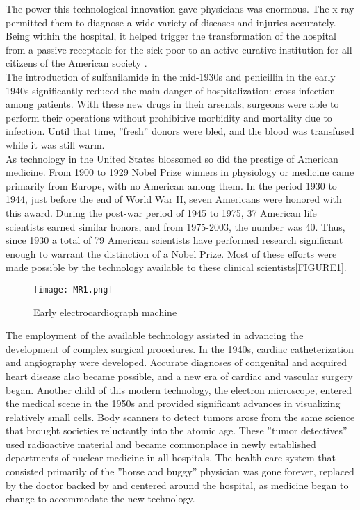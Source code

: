 \documentclass[12pt]{article}
\begin{document}
The power this technological innovation gave physicians was enormous.
The x\- ray permitted them to diagnose a wide variety of diseases and injuries accurately.
Being within the hospital, it helped trigger the transformation of the hospital from a passive receptacle for the sick poor to an active curative institution for all citizens of the American society .\\


The introduction of sulfanilamide in the mid-1930s and penicillin in the early 1940s significantly reduced the main danger of hospitalization: cross infection among patients.
With these new drugs in their arsenals, surgeons were able to perform their operations without prohibitive morbidity and mortality due to infection.
Until that time, ''fresh'' donors were bled, and the blood was transfused while it was still warm.\\


As technology in the United States blossomed so did the prestige of American medicine.
From 1900 to 1929 Nobel Prize winners in physiology or medicine came primarily from Europe, with no American among them.
In the period 1930 to 1944, just before the end of World War II, seven Americans were honored with this award.
During the post-war period of 1945 to 1975, 37 American life scientists earned similar honors, and from 1975-2003, the number was 40.
Thus, since 1930 a total of 79 American scientists have performed research significant enough to warrant the distinction of a Nobel Prize.
Most of these efforts were made possible by the technology available to these clinical scientists[FIGURE\ref{fig_MR1}].\\

\begin{figure}[h]
\centering
\texttt{[image: MR1.png]}
\caption{Early electrocardiograph machine
}
\label{fig_MR1}
\end{figure}
The employment of the available technology assisted in advancing the development of complex surgical procedures.
In the 1940s, cardiac catheterization and angiography were developed.
Accurate diagnoses of congenital and acquired heart disease also became possible, and a new era of cardiac and vascular surgery began.
Another child of this modern technology, the electron microscope, entered the medical scene in the 1950s and provided significant advances in visualizing relatively small cells.
Body scanners to detect tumors arose from the same science that brought societies reluctantly into the atomic age.
These ''tumor detectives'' used radioactive material and became commonplace in newly established departments of nuclear medicine in all hospitals.
The health care system that consisted primarily of the ''horse and buggy'' physician was gone forever, replaced by the doctor backed by and centered around the hospital, as medicine began to change to accommodate the new technology.\\
\end{document}
